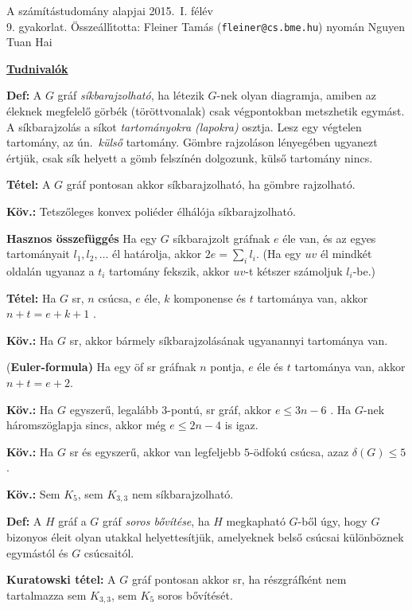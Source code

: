 \documentclass[a4paper, 12pt]{article}
\newcommand{\defi}{{\bf Def:} }
\newcommand{\tetel}{{\bf Tétel:} }
\newcommand{\kov}{{\bf Köv.:} }
\begin{document}
\begin{center}
{\huge A számítástudomány alapjai 2015.\ I. félév}\\ 
{\large 9. gyakorlat.
\"Ossze\'all\'\i totta: Fleiner Tam\'as ({\tt fleiner@cs.bme.hu}) nyomán Nguyen Tuan Hai}
\end{center}

\noindent
{\bf\large\underline{Tudnivalók}}



\defi A $G$ gráf \emph{síkbarajzolható}, ha létezik $G$-nek olyan
diagramja, amiben az éleknek megfelelő görbék (töröttvonalak) csak
végpontokban metszhetik egymást. A síkbarajzolás a síkot
\emph{tartományokra (lapokra)} osztja. Lesz egy végtelen tartomány, az ún.\
\emph{külső} tartomány. Gömbre rajzoláson lényegében ugyanezt értjük, csak
sík helyett a gömb felszínén dolgozunk, külső tartomány nincs.

\tetel A $G$ gráf pontosan akkor síkbarajzolható, ha gömbre rajzolható.

\kov Tetszőleges konvex poliéder élhálója síkbarajzolható.

{\bf Hasznos összefüggés} Ha egy $G$ síkbarajzolt gráfnak $e$ éle van, és
az egyes tartományait $l_1,l_2,\ldots$ él határolja, akkor $2e=\sum_i
l_i$. (Ha egy $uv$ él mindkét oldalán ugyanaz a $t_i$ tartomány fekszik, akkor
$uv$-t kétszer számoljuk $l_i$-be.)

\tetel Ha $G$ sr, $n$ csúcsa, $e$ éle, $k$ komponense és $t$ tartománya
van, akkor $n+t=e+k+1$ .

\kov Ha $G$ sr, akkor bármely síkbarajzolásának ugyanannyi
tartománya van.

{(\bf Euler-formula)} Ha egy öf sr gráfnak $n$ pontja, $e$ éle és
$t$ tartománya van, akkor $n+t=e+2$.


\kov Ha $G$ egyszerű, legalább $3$-pontú, sr gráf, akkor $e\le
3n-6$ . Ha $G$-nek háromszöglapja sincs, akkor még $e\le 2n-4$ is igaz.

\kov Ha $G$ sr és egyszerű, akkor van legfeljebb $5$-ödfokú
csúcsa, azaz $\delta (G)\le 5$.

\kov Sem $K_5$, sem $K_{3,3}$ nem síkbarajzolható.

\defi A $H$ gráf a $G$ gráf \emph{soros bővítése}, ha $H$
megkapható $G$-ből úgy, hogy $G$ bizonyos éleit olyan utakkal
helyettesítjük, amelyeknek belső csúcsai különböznek egymástól és $G$ csúcsaitól.

{\bf Kuratowski tétel:} A $G$ gráf pontosan akkor sr, ha részgráfként nem
tartalmazza sem $K_{3,3}$, sem $K_5$ soros bővítését.
\end{document}

